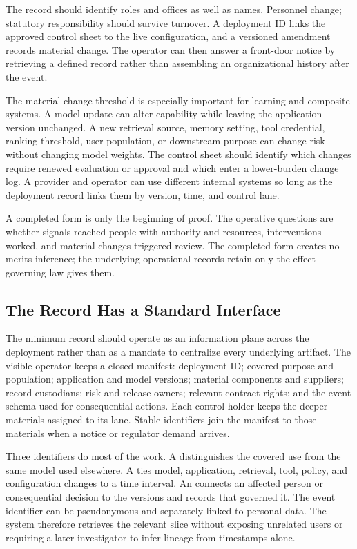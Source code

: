 The record should identify roles and offices as well as names. Personnel change; statutory responsibility should survive turnover. A deployment ID links the approved control sheet to the live configuration, and a versioned amendment records material change. The operator can then answer a front-door notice by retrieving a defined record rather than assembling an organizational history after the event.

The material-change threshold is especially important for learning and composite systems. A model update can alter capability while leaving the application version unchanged. A new retrieval source, memory setting, tool credential, ranking threshold, user population, or downstream purpose can change risk without changing model weights. The control sheet should identify which changes require renewed evaluation or approval and which enter a lower-burden change log. A provider and operator can use different internal systems so long as the deployment record links them by version, time, and control lane.

A completed form is only the beginning of proof. The operative questions are whether signals reached people with authority and resources, interventions worked, and material changes triggered review. The completed form creates no merits inference; the underlying operational records retain only the effect governing law gives them.

\subsection{The Record Has a Standard Interface}

The minimum record should operate as an information plane across the deployment rather than as a mandate to centralize every underlying artifact. The visible operator keeps a closed manifest: deployment ID; covered purpose and population; application and model versions; material components and suppliers; record custodians; risk and release owners; relevant contract rights; and the event schema used for consequential actions. Each control holder keeps the deeper materials assigned to its lane. Stable identifiers join the manifest to those materials when a notice or regulator demand arrives.

Three identifiers do most of the work. A  distinguishes the covered use from the same model used elsewhere. A  ties model, application, retrieval, tool, policy, and configuration changes to a time interval. An  connects an affected person or consequential decision to the versions and records that governed it. The event identifier can be pseudonymous and separately linked to personal data. The system therefore retrieves the relevant slice without exposing unrelated users or requiring a later investigator to infer lineage from timestamps alone.

